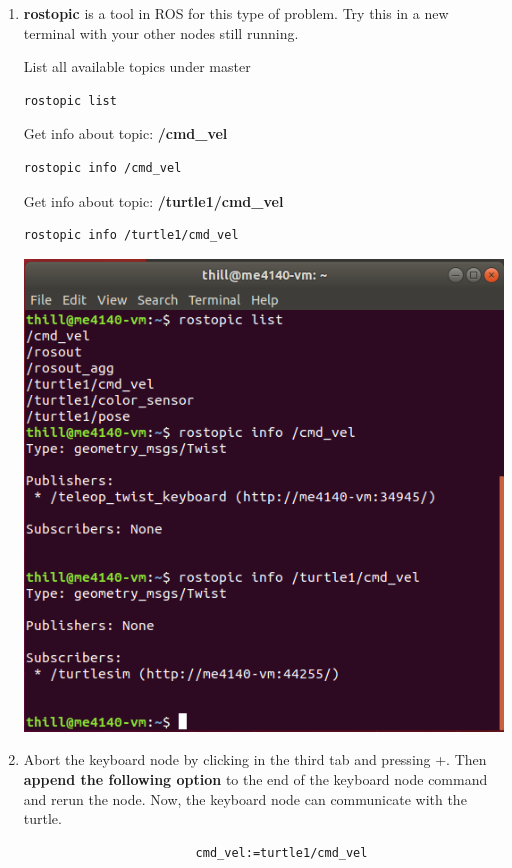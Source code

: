 \documentclass[12pt]{article}
\newcommand{\C}{\raisebox{-0.1em}{C}}
\newcommand{\CKey}{\keystroke{\C}}
\newcommand{\CTRL}{\raisebox{-0.1em}{Ctrl}}
\newcommand{\CTRLKey}{\keystroke{\CTRL}}
\begin{document}
\begin{description}
\begin{enumerate}
\newpage
\item {\bf rostopic} is a tool in ROS for this type of problem. Try this in a new terminal with your other nodes still running.



\begin{multicols}{2}

List all available topics under master
\begin{verbatim}
rostopic list
\end{verbatim}
Get info about topic: {\bf /cmd\_vel}
\begin{verbatim}
rostopic info /cmd_vel
\end{verbatim}
Get info about topic: {\bf /turtle1/cmd\_vel}
\begin{verbatim}
rostopic info /turtle1/cmd_vel
\end{verbatim}

\vspace{10mm} 

\includegraphics[scale=0.4]{tutorial3_fig4.png} \vspace{3mm}\\

\end{multicols}	
\vspace{5mm}
\item Abort the keyboard node by clicking in the third tab and pressing \CTRLKey +\CKey. Then {\bf append the following option} to the end of the keyboard node command and rerun the node. Now, the keyboard node can communicate with the turtle. 
\begin{verbatim}
                        cmd_vel:=turtle1/cmd_vel
\end{verbatim}


\end{enumerate}
\end{description}
\end{document}
